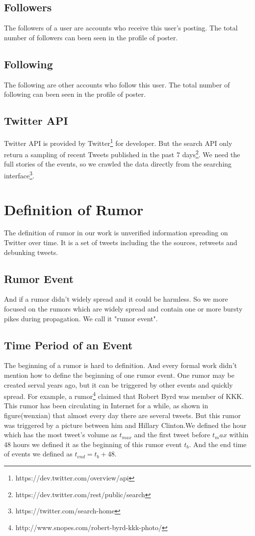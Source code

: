 \subsection{Followers}
The followers of a user are accounts who receive this user's posting. The total number of followers can been seen in the profile of poster.
\subsection{Following}
The following are other accounts who follow this user. The total number of following can been seen in the profile of poster.
\subsection{Twitter API}
Twitter API is provided by Twitter\footnote{https://dev.twitter.com/overview/api} for developer. But the search API only return a sampling of recent Tweets published in the past 7 days\footnote{https://dev.twitter.com/rest/public/search}. We need the full stories of the events, so we crawled the data directly from the searching interface\footnote{https://twitter.com/search-home}.

 \section{Definition of Rumor}
 The definition of rumor in our work is unverified information spreading on Twitter over time. It is a set of tweets including the the sources, retweets and debunking tweets. 
 \subsection{Rumor Event}
 And if a rumor didn't widely spread and it could be harmless. So we more focused on the rumors which are widely spread and contain one or more bursty pikes during propagation. We call it "rumor event".
\subsection{Time Period of an Event}
\label{sec:Time_Period_of_an_Event}

The beginning of a rumor is hard to definition. And every formal work didn't mention how to define the beginning of one rumor event. One rumor may be created serval years ago, but it can be triggered by other events and quickly spread.
For example, a rumor\footnote{http://www.snopes.com/robert-byrd-kkk-photo/} claimed that Robert Byrd was member of KKK. This rumor has been circulating in Internet for a while, as shown in figure(wenxian) that almost every day there are several tweets. But this rumor was triggered by a picture between him and Hillary Clinton.We defined the hour which has the most tweet's volume as $t_{max}$ and the first tweet before $t_max$ within 48 hours we defined it as the beginning of this rumor event $t_b$. And the end time of events we defined as  $t_{end}=t_b+48$.


